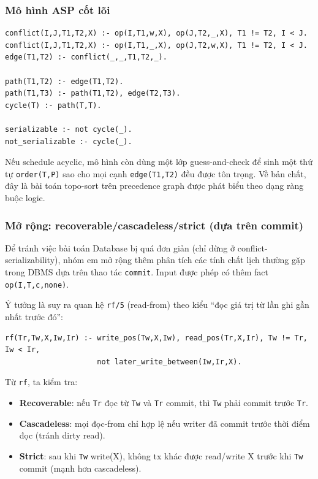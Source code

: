 ﻿\documentclass[11pt,a4paper]{article}
\begin{document}
\subsubsection*{Mô hình ASP cốt lõi}
\begin{lstlisting}[language={}]
conflict(I,J,T1,T2,X) :- op(I,T1,w,X), op(J,T2,_,X), T1 != T2, I < J.
conflict(I,J,T1,T2,X) :- op(I,T1,_,X), op(J,T2,w,X), T1 != T2, I < J.
edge(T1,T2) :- conflict(_,_,T1,T2,_).

path(T1,T2) :- edge(T1,T2).
path(T1,T3) :- path(T1,T2), edge(T2,T3).
cycle(T) :- path(T,T).

serializable :- not cycle(_).
not_serializable :- cycle(_).
\end{lstlisting}

Nếu schedule acyclic, mô hình còn dùng một lớp guess-and-check để sinh một thứ tự \texttt{order(T,P)} sao cho mọi cạnh \texttt{edge(T1,T2)} đều được tôn trọng. Về bản chất, đây là bài toán topo-sort trên precedence graph được phát biểu theo dạng ràng buộc logic.

\subsubsection*{Mở rộng: recoverable/cascadeless/strict (dựa trên commit)}
Để tránh việc bài toán Database bị quá đơn giản (chỉ dừng ở conflict-serializability), nhóm em mở rộng thêm phân tích các tính chất lịch thường gặp trong DBMS dựa trên thao tác \texttt{commit}. Input được phép có thêm fact \texttt{op(I,T,c,none)}.

Ý tưởng là suy ra quan hệ \texttt{rf/5} (read-from) theo kiểu “đọc giá trị từ lần ghi gần nhất trước đó”:
\begin{lstlisting}[language={}]
rf(Tr,Tw,X,Iw,Ir) :- write_pos(Tw,X,Iw), read_pos(Tr,X,Ir), Tw != Tr, Iw < Ir,
                     not later_write_between(Iw,Ir,X).
\end{lstlisting}

Từ \texttt{rf}, ta kiểm tra:
\begin{itemize}[leftmargin=1.5em]
  \item \textbf{Recoverable}: nếu \texttt{Tr} đọc từ \texttt{Tw} và \texttt{Tr} commit, thì \texttt{Tw} phải commit trước \texttt{Tr}.
  \item \textbf{Cascadeless}: mọi đọc-from chỉ hợp lệ nếu writer đã commit trước thời điểm đọc (tránh dirty read).
  \item \textbf{Strict}: sau khi \texttt{Tw} write(X), không tx khác được read/write X trước khi \texttt{Tw} commit (mạnh hơn cascadeless).
\end{itemize}
\end{document}
